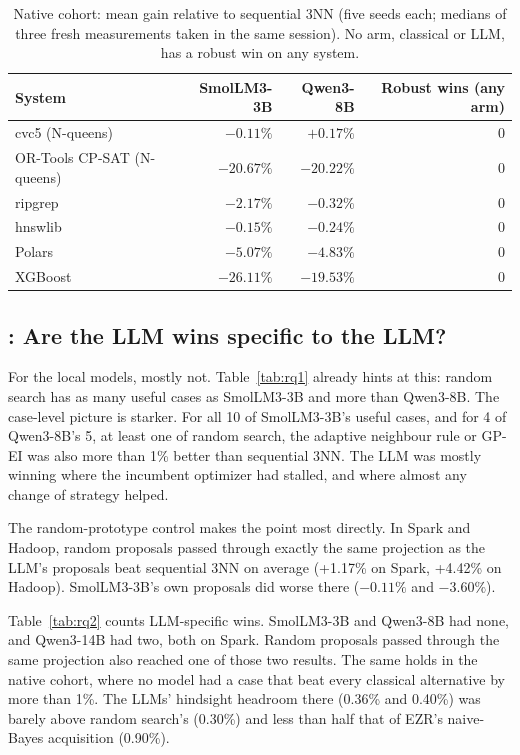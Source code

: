 \begin{table}[t]
\centering
\caption{Native cohort: mean gain relative to sequential 3NN (five seeds each; medians of three fresh measurements taken in the same session). No arm, classical or LLM, has a robust win on any system.}
\label{tab:native}
\small
\begin{tabular}{lrrr}
\toprule
System & SmolLM3-3B & Qwen3-8B & Robust wins (any arm) \\
\midrule
cvc5 (N-queens) & $-0.11\%$ & $+0.17\%$ & 0 \\
OR-Tools CP-SAT (N-queens) & $-20.67\%$ & $-20.22\%$ & 0 \\
ripgrep & $-2.17\%$ & $-0.32\%$ & 0 \\
hnswlib & $-0.15\%$ & $-0.24\%$ & 0 \\
Polars & $-5.07\%$ & $-4.83\%$ & 0 \\
XGBoost & $-26.11\%$ & $-19.53\%$ & 0 \\
\bottomrule
\end{tabular}
\end{table}

\subsection{: Are the LLM wins specific to the LLM?}
\label{sec:rq2}

For the local models, mostly not. Table~\ref{tab:rq1} already hints at this: random search has as many useful cases as SmolLM3-3B and more than Qwen3-8B. The case-level picture is starker. For all 10 of SmolLM3-3B's useful cases, and for 4 of Qwen3-8B's 5, at least one of random search, the adaptive neighbour rule or GP-EI was also more than 1\% better than sequential 3NN. The LLM was mostly winning where the incumbent optimizer had stalled, and where almost any change of strategy helped.

The random-prototype control makes the point most directly. In Spark and Hadoop, random proposals passed through exactly the same projection as the LLM's proposals beat sequential 3NN on average (+1.17\% on Spark, +4.42\% on Hadoop). SmolLM3-3B's own proposals did worse there ($-0.11\%$ and $-3.60\%$).

Table~\ref{tab:rq2} counts LLM-specific wins. SmolLM3-3B and Qwen3-8B had none, and Qwen3-14B had two, both on Spark. Random proposals passed through the same projection also reached one of those two results. The same holds in the native cohort, where no model had a case that beat every classical alternative by more than 1\%. The LLMs' hindsight headroom there (0.36\% and 0.40\%) was barely above random search's (0.30\%) and less than half that of EZR's naive-Bayes acquisition (0.90\%).

